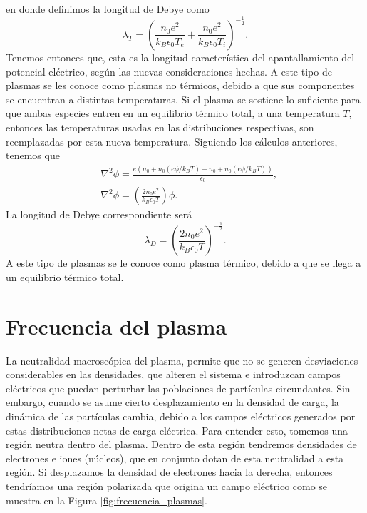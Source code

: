 \documentclass[../main.tex]{subfiles}
\begin{document}
    en donde definimos la longitud de Debye como
        \begin{equation}
            \lambda_T=  \left(\frac{n_0e^2}{k_B\epsilon_0T_e} + \frac{n_0e^2}{k_B\epsilon_0T_i}\right)^{-\frac{1}{2}}.
        \end{equation}
    Tenemos entonces que, esta es la longitud característica del apantallamiento del potencial eléctrico, según las nuevas consideraciones hechas. A este tipo de plasmas se les conoce como plasmas no térmicos, debido a que sus componentes se encuentran a distintas temperaturas. Si el plasma se sostiene lo suficiente para que ambas especies entren en un equilibrio térmico total, a una temperatura $T$, entonces las 
    temperaturas usadas en las distribuciones respectivas, son reemplazadas por esta nueva temperatura. Siguiendo los cálculos anteriores, tenemos
    que
        \begin{align}
            &\nabla^2\phi = \frac{e(n_0+n_0(e\phi/k_BT)-n_0+n_0(e\phi/k_BT))}{\epsilon_0}, \\
            &\nabla^2\phi = (\frac{2n_0e^2}{k_B\epsilon_0T})\phi.
        \end{align}
    La longitud de Debye correspondiente será
        \begin{equation}
            \lambda_D=  \left(\frac{2n_0e^2}{k_B\epsilon_0T}\right)^{-\frac{1}{2}}.
        \end{equation}
    A este tipo de plasmas se le conoce como plasma térmico, debido a que se llega a un equilibrio térmico total.


    \section{Frecuencia del plasma}

    La neutralidad macroscópica del plasma, permite que no se generen desviaciones considerables en las densidades, que alteren el sistema e introduzcan campos eléctricos que puedan perturbar las poblaciones de partículas circundantes. Sin embargo, cuando se asume cierto desplazamiento en la densidad de carga, la dinámica de las partículas cambia, debido a los campos
    eléctricos generados por estas distribuciones netas de carga eléctrica. Para entender esto, tomemos una región neutra dentro del plasma. Dentro de esta región tendremos densidades de electrones e iones (núcleos),
    que en conjunto dotan de esta neutralidad a esta región. Si desplazamos la densidad de electrones hacia la derecha, entonces tendríamos
    una región polarizada que origina un campo eléctrico como se muestra en la Figura \ref{fig:frecuencia_plasmas}.
\end{document}
